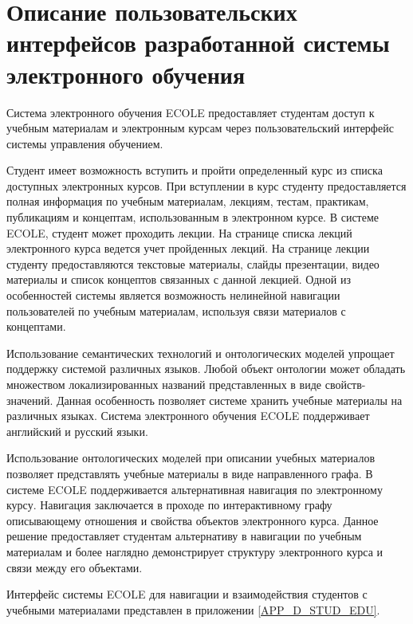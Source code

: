 \section{Описание пользовательских интерфейсов разработанной системы электронного обучения} \label{sect4_2}

Система электронного обучения ECOLE предоставляет студентам доступ к учебным материалам и электронным курсам через пользовательский интерфейс системы управления обучением. 

Студент имеет возможность вступить и пройти определенный курс из списка доступных электронных курсов. При вступлении в курс студенту предоставляется полная информация по учебным материалам, лекциям, тестам, практикам, публикациям и концептам, использованным в электронном курсе. В системе ECOLE, студент может проходить лекции. На странице списка лекций электронного курса ведется учет пройденных лекций. На странице лекции студенту предоставляются текстовые материалы, слайды презентации, видео материалы и список концептов связанных с данной лекцией. Одной из особенностей системы является возможность нелинейной навигации пользователей по учебным материалам, используя связи материалов с концептами.

Использование семантических технологий и онтологических моделей упрощает поддержку системой различных языков. Любой объект онтологии может обладать множеством локализированных названий представленных в виде свойств-значений. Данная особенность позволяет системе хранить учебные материалы на различных языках. Система электронного обучения ECOLE поддерживает английский и русский языки.

Использование онтологических моделей при описании учебных материалов позволяет представлять учебные материалы в виде направленного графа. В системе ECOLE поддерживается альтернативная навигация по электронному курсу. Навигация заключается в проходе по интерактивному графу описывающему отношения и свойства объектов электронного курса. Данное решение предоставляет студентам альтернативу в навигации по учебным материалам и более наглядно демонстрирует структуру электронного курса и связи между его объектами.

Интерфейс системы ECOLE для навигации и взаимодействия студентов с учебными материалами представлен в приложении \ref{APP_D_STUD_EDU}.

